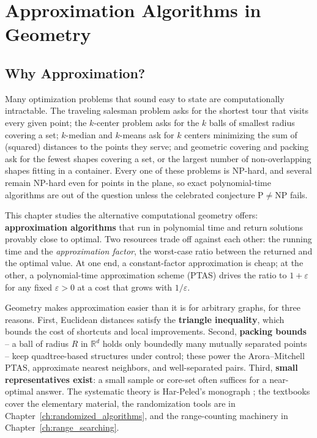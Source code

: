 \chapter{Approximation Algorithms in Geometry}
\label{ch:approximation_algorithms}

\section{Why Approximation?}
\label{sec:approx_why}

Many optimization problems that sound easy to state are computationally
intractable. The traveling salesman problem asks for the shortest tour that
visits every given point; the $k$-center problem asks for the $k$ balls of
smallest radius covering a set; $k$-median and $k$-means ask for $k$ centers
minimizing the sum of (squared) distances to the points they serve; and
geometric covering and packing ask for the fewest shapes covering a set, or
the largest number of non-overlapping shapes fitting in a container. Every
one of these problems is NP-hard, and several remain NP-hard even for points
in the plane, so exact polynomial-time algorithms are out of the question
unless the celebrated conjecture $\mathrm{P} \neq \mathrm{NP}$ fails.

This chapter studies the alternative computational geometry offers:
\textbf{approximation algorithms} that run in
polynomial time and return solutions provably close to optimal. Two
resources trade off against each other: the running time and the
\emph{approximation factor}, the worst-case ratio between the returned and
the optimal value. At one end, a constant-factor approximation is cheap; at
the other, a polynomial-time approximation scheme (PTAS) drives the ratio to
$1 + \varepsilon$ for any fixed $\varepsilon > 0$ at a cost that grows with
$1/\varepsilon$.

Geometry makes approximation easier than it is for arbitrary graphs, for
three reasons. First, Euclidean distances satisfy the
\textbf{triangle inequality}, which bounds the
cost of shortcuts and local improvements. Second,
\textbf{packing bounds} -- a ball of radius $R$ in $\mathbb{R}^d$ holds only
boundedly many mutually separated points -- keep quadtree-based structures
under control; these power the Arora--Mitchell PTAS, approximate nearest
neighbors, and well-separated pairs. Third, \textbf{small representatives
exist}: a small sample or core-set often suffices for a near-optimal answer.
The systematic theory is Har-Peled's monograph \cite{harpeled2011};
the textbooks \cite{deberg2008,cormen2009} cover the elementary material,
the randomization tools are in Chapter~\ref{ch:randomized_algorithms}, and
the range-counting machinery in Chapter~\ref{ch:range_searching}.

